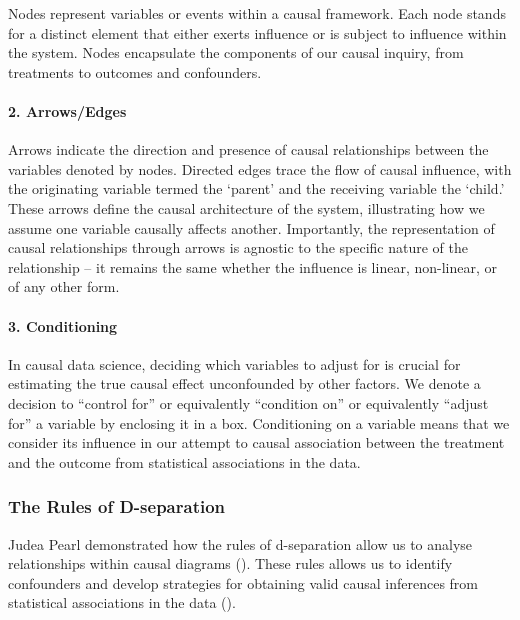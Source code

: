 \documentclass[
  singlecolumn]{article}
\let\oldparagraph\paragraph
\renewcommand{\paragraph}[1]{\oldparagraph{#1}\mbox{}}
\begin{document}
Nodes represent variables or events within a causal framework. Each node
stands for a distinct element that either exerts influence or is subject
to influence within the system. Nodes encapsulate the components of our
causal inquiry, from treatments to outcomes and confounders.

\paragraph{\texorpdfstring{2.
\textbf{Arrows/Edges}}{2. Arrows/Edges}}\label{arrowsedges}

Arrows indicate the direction and presence of causal relationships
between the variables denoted by nodes. Directed edges trace the flow of
causal influence, with the originating variable termed the `parent' and
the receiving variable the `child.' These arrows define the causal
architecture of the system, illustrating how we assume one variable
causally affects another. Importantly, the representation of causal
relationships through arrows is agnostic to the specific nature of the
relationship -- it remains the same whether the influence is linear,
non-linear, or of any other form.

\paragraph{\texorpdfstring{3.
\textbf{Conditioning}}{3. Conditioning}}\label{conditioning}

In causal data science, deciding which variables to adjust for is
crucial for estimating the true causal effect unconfounded by other
factors. We denote a decision to ``control for'' or equivalently
``condition on'' or equivalently ``adjust for'' a variable by enclosing
it in a box. Conditioning on a variable means that we consider its
influence in our attempt to causal association between the treatment and
the outcome from statistical associations in the data.

\subsubsection{The Rules of
D-separation}\label{the-rules-of-d-separation}

Judea Pearl demonstrated how the rules of d-separation allow us to
analyse relationships within causal diagrams
(). These rules allows us to
identify confounders and develop strategies for obtaining valid causal
inferences from statistical associations in the data
().
\end{document}
